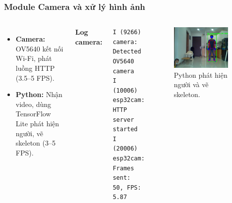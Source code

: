 \begin{frame}[t,fragile]
\frametitle{Module Camera và xử lý hình ảnh}
\begin{columns}[T]
    \begin{itemize}
        \item \textbf{Camera:} OV5640 kết nối Wi-Fi, phát luồng HTTP (3.5--5 FPS).
        \item \textbf{Python:} Nhận video, dùng TensorFlow Lite phát hiện người, vẽ skeleton (3--5 FPS).
    \end{itemize}
    \textbf{Log camera:}
    \begin{verbatim}
I (9266) camera: Detected OV5640 camera
I (10006) esp32cam: HTTP server started
I (20006) esp32cam: Frames sent: 50, FPS: 5.87
    \end{verbatim}
    \begin{figure}
        \centering
        \includegraphics[width=0.9\textwidth]{images/fall_detection_screen_shoot.png}
        \caption{Python phát hiện người và vẽ skeleton.}
        \label{fig:python_skeleton}
    \end{figure}
\end{columns}
\end{frame}

